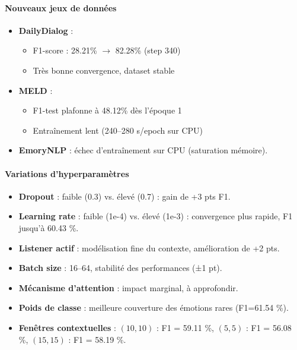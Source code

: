 \documentclass[a4paper,11pt]{article}
\begin{document}
\paragraph{Nouveaux jeux de données}
\begin{itemize}
  \item \textbf{DailyDialog} : 
    \begin{itemize}
      \item F1-score : 28.21\% $\rightarrow$ 82.28\% (step 340)
      \item Très bonne convergence, dataset stable
    \end{itemize}
  \item \textbf{MELD} :
    \begin{itemize}
      \item F1-test plafonne à 48.12\% dès l'époque 1  
      \item Entraînement lent (240--280 s/epoch sur CPU)
    \end{itemize}
  \item \textbf{EmoryNLP} : échec d’entraînement sur CPU (saturation mémoire).
\end{itemize}

\paragraph{Variations d’hyperparamètres}
\begin{itemize}
  \item \textbf{Dropout} : faible (0.3) vs. élevé (0.7) : gain de +3 pts F1.
  \item \textbf{Learning rate} : faible (1e-4) vs. élevé (1e-3) : convergence plus rapide, F1 jusqu’à 60.43 \%.
  \item \textbf{Listener actif} : modélisation fine du contexte, amélioration de +2 pts.
  \item \textbf{Batch size} : 16–64, stabilité des performances (±1 pt).
  \item \textbf{Mécanisme d’attention} : impact marginal, à approfondir.
  \item \textbf{Poids de classe} : meilleure couverture des émotions rares (F1=61.54 \%).
  \item \textbf{Fenêtres contextuelles} : $(10,10)$ : F1 = 59.11 \%, $(5,5)$ : F1 = 56.08 \%, $(15,15)$ : F1 = 58.19 \%.
  
\end{itemize}
\end{document}

